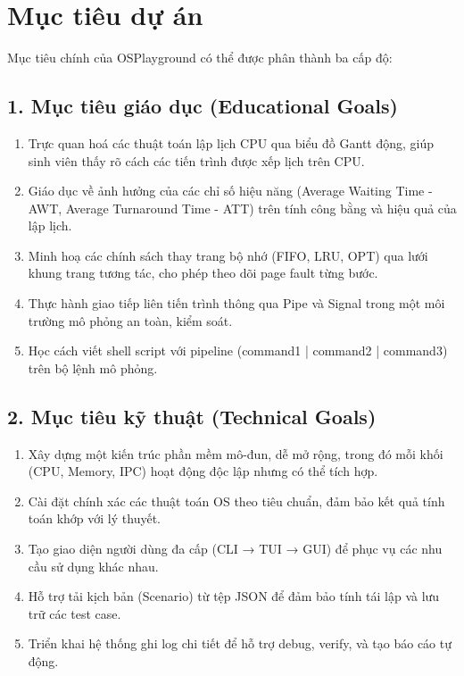 \section{Mục tiêu dự án}

Mục tiêu chính của OSPlayground có thể được phân thành ba cấp độ:

\subsection*{1. Mục tiêu giáo dục (Educational Goals)}

\begin{enumerate}[leftmargin=1.5cm]
  \item Trực quan hoá các thuật toán lập lịch CPU qua biểu đồ Gantt động, 
  giúp sinh viên thấy rõ cách các tiến trình được xếp lịch trên CPU.
  
  \item Giáo dục về ảnh hưởng của các chỉ số hiệu năng (Average Waiting Time - AWT, 
  Average Turnaround Time - ATT) trên tính công bằng và hiệu quả của lập lịch.
  
  \item Minh hoạ các chính sách thay trang bộ nhớ (FIFO, LRU, OPT) 
  qua lưới khung trang tương tác, cho phép theo dõi page fault từng bước.
  
  \item Thực hành giao tiếp liên tiến trình thông qua Pipe và Signal 
  trong một môi trường mô phỏng an toàn, kiểm soát.
  
  \item Học cách viết shell script với pipeline (command1 | command2 | command3) 
  trên bộ lệnh mô phỏng.
\end{enumerate}

\subsection*{2. Mục tiêu kỹ thuật (Technical Goals)}

\begin{enumerate}[leftmargin=1.5cm]
  \item Xây dựng một kiến trúc phần mềm mô-đun, dễ mở rộng, 
  trong đó mỗi khối (CPU, Memory, IPC) hoạt động độc lập nhưng có thể tích hợp.
  
  \item Cài đặt chính xác các thuật toán OS theo tiêu chuẩn, 
  đảm bảo kết quả tính toán khớp với lý thuyết.
  
  \item Tạo giao diện người dùng đa cấp (CLI → TUI → GUI) 
  để phục vụ các nhu cầu sử dụng khác nhau.
  
  \item Hỗ trợ tải kịch bản (Scenario) từ tệp JSON 
  để đảm bảo tính tái lập và lưu trữ các test case.
  
  \item Triển khai hệ thống ghi log chi tiết 
  để hỗ trợ debug, verify, và tạo báo cáo tự động.
\end{enumerate}

